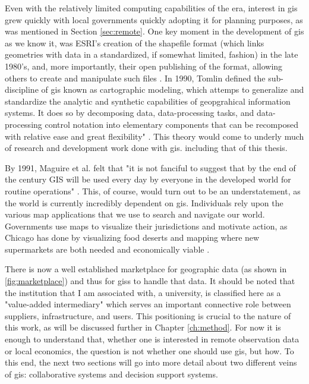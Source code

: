 Even with the relatively limited computing capabilities of the era, interest in \ac{gis} grew quickly with local governments quickly adopting it for planning purposes, as was mentioned in Section \ref{sec:remote}. One key moment in the development of \ac{gis} as we know it, was ESRI's creation of the shapefile format (which links geometries with data in a standardized, if somewhat limited, fashion) in the late 1980's, and, more importantly, their open publishing of the format, allowing others to create and manipulate such files \cite{goodchildModelingEarth2011}. In 1990, Tomlin defined the sub-discipline of \ac{gis} known as cartographic modeling, which attemps to generalize and standardize the analytic and synthetic capabilities of geopgrahical information systems. It does so by decomposing data, data-processing tasks, and data-processing control notation into elementary components that can be recomposed with relative ease and great flexibility" \cite{tomlinGISCartographicModeling2012}. This theory would come to underly much of research and development work done with \ac{gis}. including that of this thesis. 

By 1991, Maguire et al. felt that "it is not fanciful to suggest that by the end of the century GIS will be used every day by everyone in the developed world for routine operations" \cite{maguireGeographicalInformationSystems1991}. This, of course, would turn out to be an understatement, as the world is currently incredibly dependent on \ac{gis}. Individuals rely upon the various map applications that we use to search and navigate our world. Governments use maps to visualize their jurisdictions and motivate action, as Chicago has done by visualizing food deserts and mapping where new supermarkets are both needed and economically viable \cite{goldsmithResponsiveCityEngaging2014}.

There is now a well established marketplace for geographic data (as shown in \ref{fig:marketplace}) and thus for \acp{gis} to handle that data. It should be noted that the institution that I am associated with, a university, is classified here as a "value-added intermediary" which serves an important connective role between suppliers, infrastructure, and users. This positioning is crucial to the nature of this work, as will be discussed further in Chapter \ref{ch:method}. For now it is enough to understand that, whether one is interested in remote observation data or local economics, the question is not whether one should use \ac{gis}, but how. To this end, the next two sections will go into more detail about two different veins of \ac{gis}: collaborative systems and decision support systems.

